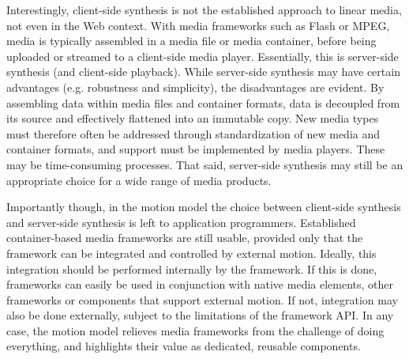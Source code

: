 Interestingly, client-side synthesis is not the established approach to linear
media, not even in the Web context. With media frameworks such as Flash or
MPEG, media is typically assembled in a media file or media container, before
being uploaded or streamed to a client-side media player. Essentially, this is
server-side synthesis (and client-side playback). While server-side synthesis
may have certain advantages (e.g. robustness and simplicity), the
disadvantages are evident. By assembling data within media files and container
formats, data is decoupled from its source and effectively flattened into an
immutable copy. New media types must therefore often be addressed through
standardization of new media and container formats, and support must be
implemented by media players. These may be time-consuming processes. That
said, server-side synthesis may still be an appropriate choice for a wide
range of media products.

Importantly though, in the motion model the choice between client-side 
synthesis and server-side synthesis is left to application programmers.
Established container-based media frameworks are still usable, provided only
that the framework can be integrated and controlled by external motion.
Ideally, this integration should be performed internally by the framework. If
this is done, frameworks can easily be used in conjunction with native media
elements, other frameworks or components that support external motion. If not,
integration may also be done externally, subject to the limitations of the
framework API. In any case, the motion model relieves media
frameworks from the challenge of doing everything, and highlights their value
as dedicated, reusable components.
